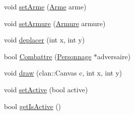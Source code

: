 \begin{DoxyCompactItemize}
\item 
void \hyperlink{classPersonnage_a20b675cc63e94015ddced4e7db6d9b56}{set\+Arme} (\hyperlink{classArme}{Arme} arme)
\item 
void \hyperlink{classPersonnage_a331e0aeb7190a266cfb879acdd22e83a}{set\+Armure} (\hyperlink{classArmure}{Armure} armure)
\item 
void \hyperlink{classPersonnage_afc55c03d855c3f6caf71cdb061829a6d}{deplacer} (int x, int y)
\item 
bool \hyperlink{classPersonnage_ab3b895b1830c07d547a36f0827ec9eb4}{Combattre} (\hyperlink{classPersonnage}{Personnage} $\ast$adversaire)
\item 
void \hyperlink{classPersonnage_a745bf0265378d340d7dd6f2a8225421f}{draw} (clan\+::\+Canvas c, int x, int y)
\item 
void \hyperlink{classPersonnage_ab3ce2fb4d37fc9b3bbef43d33910ac2f}{set\+Active} (bool active)
\item 
bool \hyperlink{classPersonnage_a5a95a7603154e30550bd67cf4bd4f990}{get\+Is\+Active} ()
\end{DoxyCompactItemize}
